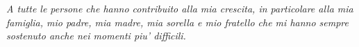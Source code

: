 \thispagestyle{empty}
\begin{flushright}
\null{}
\textit{A tutte le persone che hanno contribuito alla mia crescita, in particolare alla mia famiglia, mio padre, mia madre, mia sorella e mio fratello che mi hanno sempre sostenuto anche nei momenti piu' difficili.}
\null
\end{flushright}